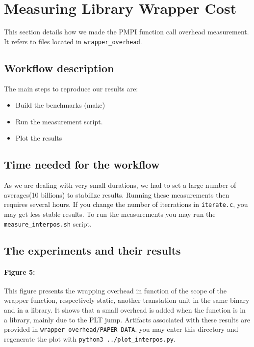 \section{Measuring Library Wrapper Cost}
\label{sec:wrapper}

This section details how we made the PMPI function call overhead measurement. It refers to files located in \texttt{wrapper\_overhead}.
\subsection{Workflow description}

The main steps to reproduce our results are:

\begin{itemize}
\item Build the benchmarks (make)
\item Run the measurement script.
\item Plot the results
\end{itemize}

\subsection{Time needed for the workflow}

As we are dealing with very small durations, we had to set a large number of averages(10 billions) to stabilize results. Running these measurements then requires several hours. If you change the number of iterrations in \texttt{iterate.c}, you may get less stable results. To run the measurements you may run the \texttt{measure\_interpos.sh} script.

\subsection{The experiments and their results}

\paragraph*{\textbf{Figure 5:}} This figure presents the wrapping overhead in function of the scope of the wrapper function, respectively static, another transtation unit in the same binary and in a library. It shows that a small overhead is added when the function is in a library, mainly due to the PLT jump. Artifacts associated with these results are provided in \texttt{wrapper\_overhead/PAPER\_DATA}, you may enter this directory and regenerate the plot with \texttt{python3 ../plot\_interpos.py}.

